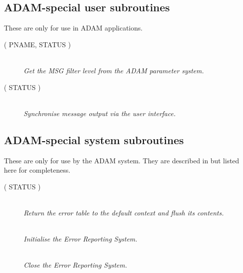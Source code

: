 \documentclass[twoside,11pt]{starlink}
\providecommand{\listline}{\hspace{1pt}\\}
\begin{document}
\subsection{ADAM-special user subroutines}
These are only for use in ADAM applications.
\begin {description}
\item [ ( PNAME, STATUS )] \listline
\textit{ Get the MSG filter level from the ADAM parameter system.}
\item [ ( STATUS )] \listline
\textit{ Synchronise message output via the user interface.}
\end{description}

\subsection{ADAM-special system subroutines}
These are only for use by the ADAM system. They are described in
but listed here for completeness.
\begin {description}
\item [ ( STATUS )] \listline
\textit{ Return the error table to the default context and flush its contents.}
\item [] \listline
\textit{ Initialise the Error Reporting System.}
\item [] \listline
\textit{ Close the Error Reporting System.}
\end{description}

\newpage
\end{document}
